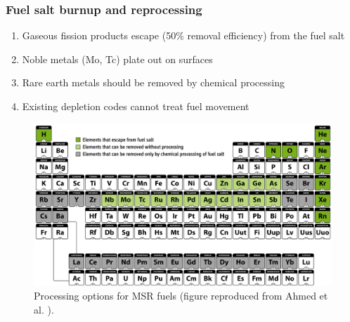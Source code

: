 \begin{frame}
\frametitle{Fuel salt burnup and reprocessing}
\vspace*{-0.05in}
\begin{enumerate}
	\item Gaseous fission products escape (50\% removal efficiency) from the fuel salt
	\item Noble metals (Mo, Tc) plate out on surfaces
	\item Rare earth metals should be removed by chemical processing
	\item Existing depletion codes cannot treat fuel movement
\end{enumerate}

\begin{figure}[t]
	\hspace*{-0.2in}
	\includegraphics[height=0.48\textwidth]{../figures/periodic_map.png}
	\vspace*{-0.05in}
	\caption{Processing options for MSR fuels (figure reproduced from Ahmed et al. \cite{ahmad_neutronics_2015}).}
\end{figure}               
\end{frame}


